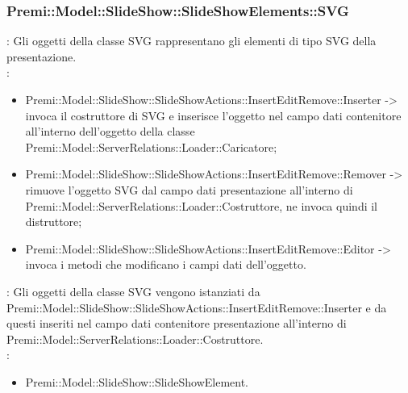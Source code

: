 {                    \subsubsection{Premi::Model::SlideShow::SlideShowElements::SVG}{
				\textbf{\tipo}: Gli oggetti della classe SVG rappresentano gli elementi di tipo SVG della presentazione.\\
				\textbf{\relaz}: 
				\begin{itemize}
					\item Premi::Model::SlideShow::SlideShowActions::InsertEditRemove::Inserter -> invoca il costruttore di SVG e inserisce l’oggetto nel campo dati contenitore all’interno dell’oggetto della classe Premi::Model::ServerRelations::Loader::Caricatore;
                    \item Premi::Model::SlideShow::SlideShowActions::InsertEditRemove::Remover -> rimuove l’oggetto SVG dal campo dati presentazione all’interno di Premi::Model::ServerRelations::Loader::Costruttore, ne invoca quindi il distruttore;
                    \item Premi::Model::SlideShow::SlideShowActions::InsertEditRemove::Editor -> invoca i metodi che modificano i campi dati dell'oggetto.
				\end{itemize}	
                \textbf{\interfacce}: Gli oggetti della classe SVG vengono istanziati da Premi::Model::SlideShow::SlideShowActions::InsertEditRemove::Inserter e da questi inseriti nel campo dati contenitore presentazione all’interno di Premi::Model::ServerRelations::Loader::Costruttore.\\
                \textbf{\base}: 
                    \begin{itemize}
                    \item Premi::Model::SlideShow::SlideShowElement.
                    \end{itemize}
                    }
}
